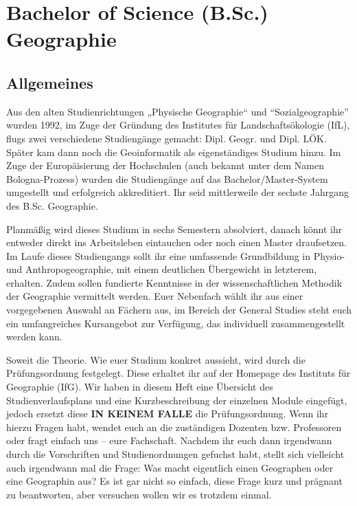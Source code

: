 \chapter{Bachelor of Science (B.Sc.) Geographie}

\section{Allgemeines}
Aus den alten Studienrichtungen „Physische Geographie“ und "`Sozialgeographie"' wurden 1992, im Zuge der Gründung des Institutes für Landschaftsökologie (IfL), flugs zwei verschiedene Studiengänge gemacht: Dipl. Geogr. und Dipl. LÖK. Später kam dann noch die Geoinformatik als eigenständiges Studium hinzu. Im Zuge der Europäisierung der Hochschulen (auch bekannt unter dem Namen Bologna-Prozess) wurden die Studiengänge auf das Bachelor/Master-System umgestellt und erfolgreich akkreditiert. Ihr seid mittlerweile der sechste Jahrgang des B.Sc. Geographie.

Planmäßig wird dieses Studium in sechs Semestern absolviert, danach könnt ihr entweder direkt ins Arbeitsleben eintauchen oder noch einen Master draufsetzen. Im Laufe dieses Studiengangs sollt ihr eine umfassende Grundbildung in Physio- und Anthropogeographie, mit einem deutlichen Übergewicht in letzterem, erhalten. Zudem sollen fundierte Kenntnisse in der wissenschaftlichen Methodik der Geographie vermittelt werden. Euer Nebenfach wählt ihr aus einer vorgegebenen Auswahl an Fächern aus, im Bereich der General Studies steht euch ein umfangreiches Kursangebot zur Verfügung, das individuell zusammengestellt werden kann.

Soweit die Theorie. Wie euer Studium konkret aussieht, wird durch die Prüfungsordnung festgelegt. Diese erhaltet ihr auf der Homepage des Instituts für Geographie (IfG). Wir haben in diesem Heft eine Übersicht des Studienverlaufsplans und eine Kurzbeschreibung der einzelnen Module eingefügt, jedoch ersetzt diese \textbf{IN KEINEM FALLE} die Prüfungsordnung. Wenn ihr hierzu Fragen habt, wendet euch an die zuständigen Dozenten bzw. Professoren oder fragt einfach uns – eure Fachschaft. Nachdem ihr euch dann irgendwann durch die Vorschriften und Studienordnungen gefuchst habt, stellt sich vielleicht auch irgendwann mal die Frage: Was macht eigentlich einen Geographen oder eine Geographin aus? Es ist gar nicht so einfach, diese Frage kurz und prägnant zu beantworten, aber versuchen wollen wir es trotzdem einmal.

